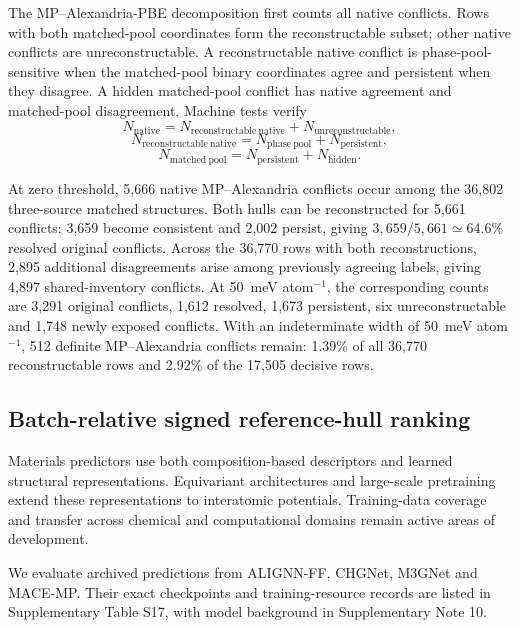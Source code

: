 \documentclass[twoside,twocolumn,9pt]{article}
\begin{document}
The MP--Alexandria-PBE decomposition first counts all native conflicts. Rows with both matched-pool coordinates form the reconstructable subset; other native conflicts are unreconstructable. A reconstructable native conflict is phase-pool-sensitive when the matched-pool binary coordinates agree and persistent when they disagree. A hidden matched-pool conflict has native agreement and matched-pool disagreement. Machine tests verify
\[
N_{\mathrm{native}}=N_{\mathrm{reconstructable\ native}}+N_{\mathrm{unreconstructable}},
\]
\[
N_{\mathrm{reconstructable\ native}}
=N_{\mathrm{phase\ pool}}+N_{\mathrm{persistent}},
\]
\[
N_{\mathrm{matched\ pool}}
=N_{\mathrm{persistent}}+N_{\mathrm{hidden}}.
\]

At zero threshold, 5,666 native MP--Alexandria conflicts occur among the 36,802 three-source matched structures. Both hulls can be reconstructed for 5,661 conflicts: 3,659 become consistent and 2,002 persist, giving $3,659/5,661\simeq64.6\%$ resolved original conflicts. Across the 36,770 rows with both reconstructions, 2,895 additional disagreements arise among previously agreeing labels, giving 4,897 shared-inventory conflicts. At 50~meV atom$^{-1}$, the corresponding counts are 3,291 original conflicts, 1,612 resolved, 1,673 persistent, six unreconstructable and 1,748 newly exposed conflicts. With an indeterminate width of 50~meV atom$^{-1}$, 512 definite MP--Alexandria conflicts remain: 1.39\% of all 36,770 reconstructable rows and 2.92\% of the 17,505 decisive rows.

\subsection{Batch-relative signed reference-hull ranking}

Materials predictors use both composition-based descriptors and learned structural representations.\cite{ward2016general,zou2025predicting,xie2018crystal,chen2019graph,schutt2018schnet,choudhary2021atomistic} Equivariant architectures and large-scale pretraining extend these representations to interatomic potentials.\cite{batzner20223,musaelian2023learning,deng2023chgnet,chen2022universal,batatia2025foundation} Training-data coverage and transfer across chemical and computational domains remain active areas of development.\cite{deng2025systematic,kuner2025mp,kim2026optimizing,lysogorskiy2026graph}

We evaluate archived predictions from ALIGNN-FF, CHGNet, M3GNet and MACE-MP. Their exact checkpoints and training-resource records are listed in Supplementary Table S17, with model background in Supplementary Note 10.
\end{document}
